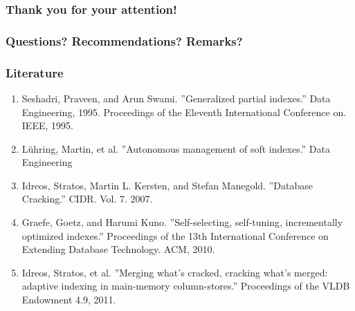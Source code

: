 \documentclass{beamer}
\begin{document}
\begin{frame}
\frametitle{Thank you for your attention!}
\end{frame}

\begin{frame}
\frametitle{Questions? Recommendations? Remarks?}
\end{frame}

\begin{frame}
\frametitle{Literature}
\begin{enumerate}
\item{Seshadri, Praveen, and Arun Swami. ”Generalized partial indexes.” Data Engineering, 1995. Proceedings of the Eleventh International Conference on. IEEE, 1995.}
\item{L\"uhring, Martin, et al. ”Autonomous management of soft indexes.” Data Engineering}
\item{Idreos, Stratos, Martin L. Kersten, and Stefan Manegold. ”Database
Cracking.” CIDR. Vol. 7. 2007.}
\item{Graefe, Goetz, and Harumi Kuno. ”Self-selecting, self-tuning, incrementally optimized indexes.” Proceedings of the 13th International Conference on Extending Database Technology. ACM, 2010.}
\item{Idreos, Stratos, et al. ”Merging what’s cracked, cracking what’s merged: adaptive indexing in main-memory column-stores.” Proceedings of the VLDB Endowment 4.9, 2011.}
\end{enumerate}
\end{frame}
\end{document}
